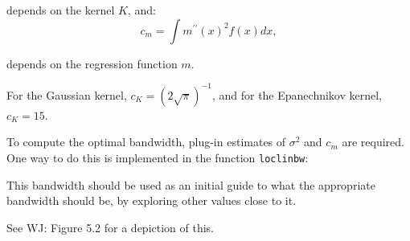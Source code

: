 depends on the kernel $K$, and:
\begin{equation}
c_m=\int m^{\prime\prime}(x)^2f(x)dx,
\end{equation}

depends on the regression function $m$.

For the Gaussian kernel, $c_K=(2\sqrt{\pi})^{-1}$, and for the Epanechnikov kernel, $c_K=15$.

To compute the optimal bandwidth, plug-in estimates of $\sigma^2$ and $c_m$ are required. One way to do this is implemented in the \Matlab function {\tt loclinbw}:
\begin{VrbM}
%
%
%
%
%
\end{VrbM}
This bandwidth should be used as an initial guide to what the appropriate bandwidth should be, by exploring other values close to it.

See WJ: Figure 5.2 for a depiction of this.

